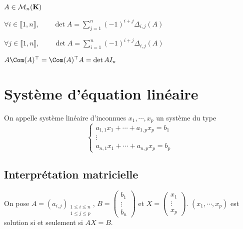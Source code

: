 \begin{thm}
    \Hyp $A \in  \mathcal  M_n(\mathbf K)$
    \begin{concenum}
    \item $ \forall  i \in  \llbracket 1, n \rrbracket , \qquad  \displaystyle \det A=\sum_{j=1}^n (-1)^{i+j}\Delta_{i,j}(A)$
    \item $ \forall  j \in  \llbracket 1, n \rrbracket , \qquad  \displaystyle \det A=\sum_{i=1}^n (-1)^{i+j}\Delta_{i,j}(A)$
    \item $A\Com(A)^\top = \Com(A)^\top A=\det A I_n$
    \end{concenum}
\end{thm}


\section{Système d'équation linéaire}

On appelle système linéaire d'inconnues $x_1, \cdots , x_p$ un système du type \[
\begin{cases}
    a_{1,1}x_1+\cdots +a_{1,p}x_p=b_1\\
    \vdots \\
    a_{n,1}x_1+\cdots +a_{n,p}x_p=b_p
\end{cases}
\] 

\subsection{Interprétation matricielle}

On pose $A=(a_{i,j}) _{\substack{1\leq i\leq n\\1\leq j\leq p}}$, $\displaystyle B= \begin{pmatrix}
    b_1\\ \vdots \\ b_n
\end{pmatrix} $ et $\displaystyle X= \begin{pmatrix}
    x_1 \\ \vdots \\ x_p
\end{pmatrix}$. $(x_1, \cdots , x_p)$ est solution si et seulement si $AX=B$.

